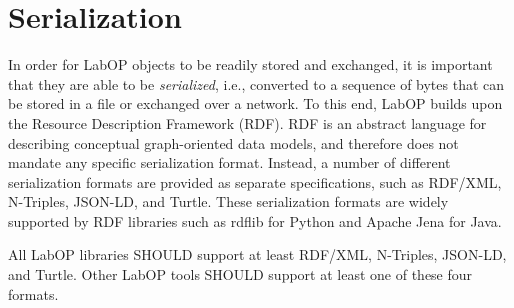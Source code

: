 \section{Serialization}
\label{sec:serialization}

In order for LabOP objects to be readily stored and exchanged, it is important that they are able to be {\em serialized}, i.e., converted to a sequence of bytes that can be stored in a file or exchanged over a network.  
%
To this end, LabOP builds upon the Resource Description Framework (RDF).  RDF is an abstract language for describing conceptual graph-oriented data models, and therefore does not mandate any specific serialization format.  Instead, a number of different serialization formats are provided as separate specifications, such as RDF/XML, N-Triples, JSON-LD, and Turtle.  These serialization formats are widely supported by RDF libraries such as rdflib for Python and Apache Jena for Java.

All LabOP libraries SHOULD support at least RDF/XML, N-Triples, JSON-LD, and Turtle.
Other LabOP tools SHOULD support at least one of these four formats.
